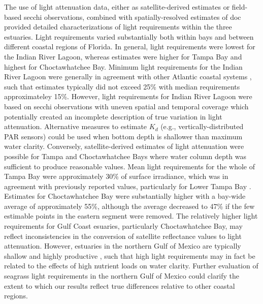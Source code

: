 \documentclass[letterpaper,12pt,oneside]{article}\usepackage[]{graphicx}\usepackage[]{color}
\begin{document}
The use of light attenuation data, either as satellite-derived estimates or field-based secchi observations, combined with spatially-resolved estimates of \ac{doc} provided detailed characterizations of light requirements within the three estuaries.  Light requirements varied substantially both within bays and between different coastal regions of Florida.  In general, light requirements were lowest for the Indian River Lagoon, whereas estimates were higher for Tampa Bay and highest for Choctawhatchee Bay. Minimum light requirements for the Indian River Lagoon were generally in agreement with other Atlantic coastal systems \citep{Dennison93,Kemp04}, such that estimates typically did not exceed 25\% with median requirements approximateley 15\%.  However, light requirements for Indian River Lagoon were based on secchi observations with uneven spatial and temporal coverage which potentially created an incomplete description of true variation in light attenuation.  Alternative measures to estimate $K_d$ (e.g., vertically-distributed PAR sensors) could be used when bottom depth is shallower than maximum water clarity.  Conversely, satellite-derived estimates of light attenuation were possible for Tampa and Choctawhatchee Bays where water column depth was sufficient to produce reasonable values. Mean light requirements for the whole of Tampa Bay were approximately 30\% of surface irradiance, which was in agreement with previously reported values, particularly for Lower Tampa Bay \citep{Dixon95}.  Estimates for Choctawhatchee Bay were substantially higher with a bay-wide average of approximately 55\%, although the average decreased to 47\% if the few estimable points in the eastern segment were removed.  The relatively higher light requirements for Gulf Coast esuaries, particularly Choctawhatchee Bay, may reflect inconsistencies in the conversion of satellite reflectance values to light attenuation.  However, estuaries in the northern Gulf of Mexico are typically shallow and highly productive \citep{Caffrey14}, such that high light requirements may in fact be related to the effects of high nutrient loads on water clarity.  Further evaluation of seagrass light requirements in the northern Gulf of Mexico could clarify the extent to which our results reflect true differences relative to other coastal regions.
\end{document}
